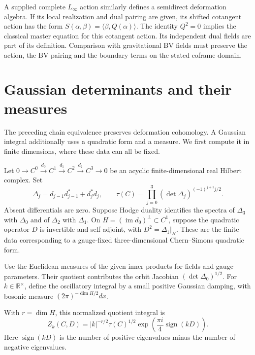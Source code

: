 A supplied complete $L_\infty$ action similarly defines a
semidirect deformation algebra. If its local realization and
dual pairing are given, its shifted cotangent action has the
form $S(\alpha,\beta)=\langle\beta,Q(\alpha)\rangle$.
The identity $Q^2=0$ implies the classical master equation
for this cotangent action.
Its independent dual fields are part of its definition.
Comparison with gravitational BV fields must preserve the action,
the BV pairing and the boundary terms on the stated coframe domain.

\section{Gaussian determinants and their measures}

The preceding chain equivalence preserves deformation cohomology.
A Gaussian integral additionally uses a quadratic form and a
measure. We first compute it in finite dimensions, where these
data can all be fixed.

Let
$0\to C^0\xrightarrow{d_0}C^1\xrightarrow{d_1}C^2
\xrightarrow{d_2}C^3\to0$
be an acyclic finite-dimensional real Hilbert complex.
Set
\[
 \Delta_j=d_{j-1}d_{j-1}^*+d_j^*d_j,
 \qquad
 \tau(C)=\prod_{j=0}^3(\det\Delta_j)^{(-1)^{j+1}j/2}.
\]
Absent differentials are zero.
Suppose Hodge duality identifies the spectra of $\Delta_3$
with $\Delta_0$ and of $\Delta_2$ with $\Delta_1$.
On $H=(\operatorname{im}d_0)^\perp\subset C^1$, suppose the
quadratic operator $D$ is invertible and self-adjoint, with
$D^2=\Delta_1|_H$.
These are the finite data corresponding to a gauge-fixed
three-dimensional Chern--Simons quadratic form.

Use the Euclidean measures of the given inner products for
fields and gauge parameters. Their quotient contributes
the orbit Jacobian $(\det\Delta_0)^{1/2}$.
For $k\in\mathbb R^\times$, define the oscillatory integral by a small positive
Gaussian damping, with bosonic measure $(2\pi)^{-\dim H/2}dx$.

\begin{proposition}\label{mht:prop:gravity-finite-torsion}
With $r=\dim H$, this normalized quotient integral is
\begin{equation}\label{mht:eq:gravity-finite-gaussian}
 Z_k(C,D)=|k|^{-r/2}\tau(C)^{1/2}
       \exp\left(\frac{\pi i}{4}\operatorname{sign}(kD)\right).
\end{equation}
Here $\operatorname{sign}(kD)$ is the number of positive
eigenvalues minus the number of negative eigenvalues.
\end{proposition}

